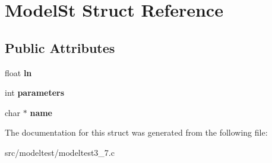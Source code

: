 \hypertarget{structModelSt}{
\section{ModelSt Struct Reference}
\label{structModelSt}
}
\subsection*{Public Attributes}
\begin{DoxyCompactItemize}
\item 
\hypertarget{structModelSt_ae112c8543adfe4b946539d391815856f}{
float {\bfseries ln}}
\label{structModelSt_ae112c8543adfe4b946539d391815856f}

\item 
\hypertarget{structModelSt_af5b410752b63ab6cbf4023a5c6c68d8d}{
int {\bfseries parameters}}
\label{structModelSt_af5b410752b63ab6cbf4023a5c6c68d8d}

\item 
\hypertarget{structModelSt_aaa1ca9eacc333f443da43cd0e26a1ec7}{
char $\ast$ {\bfseries name}}
\label{structModelSt_aaa1ca9eacc333f443da43cd0e26a1ec7}

\end{DoxyCompactItemize}


The documentation for this struct was generated from the following file:\begin{DoxyCompactItemize}
\item 
src/modeltest/modeltest3\_\-7.c\end{DoxyCompactItemize}
